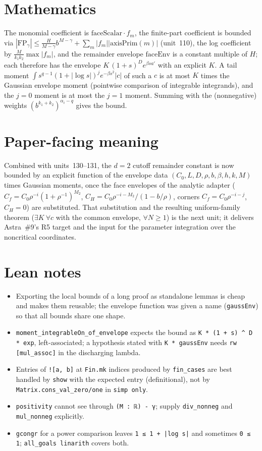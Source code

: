 \documentclass[11pt]{article}
\begin{document}
\section{Mathematics}

The monomial coefficient is $\mathrm{faceScalar}\cdot f_m$, the finite-part coefficient is bounded
via $|\mathrm{FP}_\gamma|\le\frac{H}{M-\gamma}b^{M-\gamma}+\sum_m|f_m||\mathrm{axisPrim}(m)|$
(unit~110), the log coefficient by $\frac{M}{k_1k_2}\max|f_m|$, and the remainder envelope
$\mathrm{faceEnv}$ is a constant multiple of $H$; each therefore has the envelope
$K\,(1+s)^De^{\beta sa'}$ with an explicit $K$. A tail moment $\int s^{q-1}(1+|\log s|)^je^{-\beta s^2}|c|$
of such a $c$ is at most $K$ times the Gaussian envelope moment (pointwise comparison of integrable
integrands), and the $j=0$ moment is at most the $j=1$ moment. Summing with the (nonnegative)
weights $(b^{k_1+k_2})^{\alpha_i-q}$ gives the bound.

\section{Paper-facing meaning}

Combined with units~130--131, the $d=2$ cutoff remainder constant is now bounded by an explicit
function of the envelope data $(C_0,L,D,\rho,b,\beta,h,k,M)$ times Gaussian moments, once the face
envelopes of the analytic adapter ($C_f=C_0\rho^{-i}(1+\rho^{-1})^{M_2}$,
$C_H=C_0\rho^{-i-M_2}/(1-b/\rho)$, corners $C_f=C_0\rho^{-i-j}$, $C_H=0$) are substituted. That
substitution and the resulting uniform-family theorem ($\exists K\ \forall c$ with the common
envelope, $\forall N\ge1$) is the next unit; it delivers Astra~\#9's R5 target and the input for the
parameter integration over the noncritical coordinates.

\section{Lean notes}

\begin{itemize}
\item Exporting the local bounds of a long proof as standalone lemmas is cheap and makes them
reusable; the envelope function was given a name (\texttt{gaussEnv}) so that all bounds share one
shape.
\item \texttt{moment\_integrableOn\_of\_envelope} expects the bound as
\texttt{K * (1 + s) \^{} D * exp}, left-associated; a hypothesis stated with \texttt{K * gaussEnv}
needs \texttt{rw [mul\_assoc]} in the discharging lambda.
\item Entries of \texttt{![a, b]} at \texttt{Fin.mk} indices produced by \texttt{fin\_cases} are
best handled by \texttt{show} with the expected entry (definitional), not by
\texttt{Matrix.cons\_val\_zero/one} in \texttt{simp only}.
\item \texttt{positivity} cannot see through \texttt{(M : ℝ) - γ}; supply \texttt{div\_nonneg} and
\texttt{mul\_nonneg} explicitly.
\item \texttt{gcongr} for a power comparison leaves \texttt{1 ≤ 1 + |log s|} and sometimes
\texttt{0 ≤ 1}; \texttt{all\_goals linarith} covers both.
\end{itemize}
\end{document}
